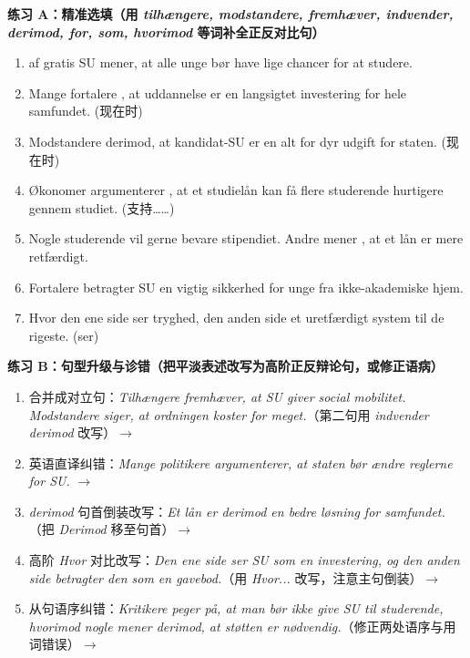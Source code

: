 \textbf{练习 A：精准选填（用 \textit{tilhængere, modstandere, fremhæver, indvender, derimod, for, som, hvorimod} 等词补全正反对比句）}
\begin{enumerate}
  \item \underline{\hspace{2.2cm}} af gratis SU mener, at alle unge bør have lige chancer for at studere.
  \item Mange fortalere \underline{\hspace{2.2cm}}, at uddannelse er en langsigtet investering for hele samfundet. (现在时)
  \item Modstandere \underline{\hspace{2.2cm}} derimod, at kandidat-SU er en alt for dyr udgift for staten. (现在时)
  \item Økonomer argumenterer \underline{\hspace{2.2cm}}, at et studielån kan få flere studerende hurtigere gennem studiet. (支持……)
  \item Nogle studerende vil gerne bevare stipendiet. Andre mener \underline{\hspace{2.2cm}}, at et lån er mere retfærdigt.
  \item Fortalere betragter SU \underline{\hspace{2.2cm}} en vigtig sikkerhed for unge fra ikke-akademiske hjem.
  \item Hvor den ene side ser tryghed, \underline{\hspace{2.2cm}} den anden side et uretfærdigt system til de rigeste. (ser)
\end{enumerate}

\textbf{练习 B：句型升级与诊错（把平淡表述改写为高阶正反辩论句，或修正语病）}
\begin{enumerate}
  \item 合并成对立句：\textit{Tilhængere fremhæver, at SU giver social mobilitet. Modstandere siger, at ordningen koster for meget.}（第二句用 \textit{indvender derimod} 改写）$\rightarrow$
  \item 英语直译纠错：\textit{Mange politikere argumenterer, at staten bør ændre reglerne for SU.} $\rightarrow$
  \item \textit{derimod} 句首倒装改写：\textit{Et lån er derimod en bedre løsning for samfundet.}（把 \textit{Derimod} 移至句首）$\rightarrow$
  \item 高阶 \textit{Hvor} 对比改写：\textit{Den ene side ser SU som en investering, og den anden side betragter den som en gavebod.}（用 \textit{Hvor...} 改写，注意主句倒装）$\rightarrow$
  \item 从句语序纠错：\textit{Kritikere peger på, at man bør ikke give SU til studerende, hvorimod nogle mener derimod, at støtten er nødvendig.}（修正两处语序与用词错误）$\rightarrow$
\end{enumerate}

